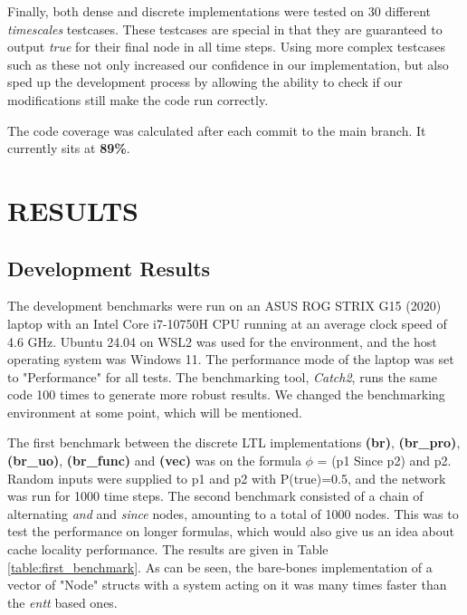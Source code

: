 \documentclass[a4paper,12pt]{report}
\begin{document}
Finally, both dense and discrete implementations were tested on 30 different \textit{timescales} testcases. These testcases are special in that they are guaranteed to output \textit{true} for their final node in all time steps. Using more complex testcases such as these not only increased our confidence in our implementation, but also sped up the development process by allowing the ability to check if our modifications still make the code run correctly.

The code coverage was calculated after each commit to the main branch. It currently sits at \textbf{89\%}.



\chapter{RESULTS}

\section{Development Results}

The development benchmarks were run on an ASUS ROG STRIX G15 (2020) laptop with an Intel Core i7-10750H CPU running at an average clock speed of 4.6 GHz. Ubuntu 24.04 on WSL2 was used for the environment, and the host operating system was Windows 11. The performance mode of the laptop was set to "Performance" for all tests. The benchmarking tool, \textit{Catch2}, runs the same code 100 times to generate more robust results. We changed the benchmarking environment at some point, which will be mentioned.

The first benchmark between the discrete LTL implementations \textbf{(br)}, \textbf{(br\_pro)}, \textbf{(br\_uo)}, \textbf{(br\_func)} and \textbf{(vec)} was on the formula $\phi$ = (p1 Since p2) and p2. Random inputs were supplied to p1 and p2 with P(true)=0.5, and the network was run for 1000 time steps. The second benchmark consisted of a chain of alternating \textit{and} and \textit{since} nodes, amounting to a total of 1000 nodes. This was to test the performance on longer formulas, which would also give us an idea about cache locality performance. The results are given in Table \ref{table:first_benchmark}. As can be seen, the bare-bones implementation of a vector of "Node" structs with a system acting on it was many times faster than the \textit{entt} based ones.
\end{document}
